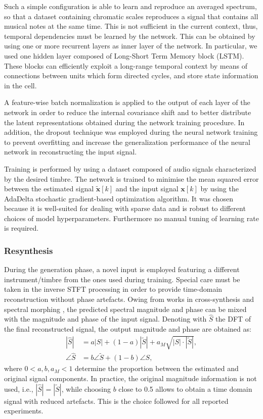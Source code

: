 Such a simple configuration is able to learn and reproduce an averaged spectrum, so that a dataset containing chromatic scales reproduces a signal that contains all musical notes at the same time. This is not sufficient in the current context, thus, temporal dependencies must be learned by the network.
This can be obtained by using one or more recurrent layers as inner layer of the network. In particular, we used one hidden layer composed of Long-Short Term Memory block (LSTM). These blocks can efficiently exploit a long-range temporal context by means of connections between units which form directed cycles, and store state information in the cell.


A feature-wise batch normalization is applied to the output of each layer of the network in order to  reduce the internal covariance shift and to better distribute the latent representations obtained during the network training procedure. In addition, the dropout technique was employed during the neural network training to prevent overfitting and increase the generalization performance of the neural network in reconstructing the input signal. 

Training is performed by using a dataset composed of audio signals characterized by the desired timbre. The network is trained to minimise the mean squared error between the estimated signal $\tilde{\mathbf{x}}[k]$ and the input signal $\mathbf{x}[k]$ by using the AdaDelta stochastic gradient-based optimization algorithm. It was chosen because it is well-suited for dealing with sparse data and is robust to different choices of model hyperparameters. Furthermore no manual tuning of learning rate is required.


\subsubsection{Resynthesis}
During the generation phase, a novel input is employed featuring a different instrument/timbre from the ones used during training. Special care must be taken in the inverse STFT processing in order to provide time-domain reconstruction without phase artefacts. Owing from works in cross-synthesis and spectral morphing \cite{Cella2013advanced}, the predicted spectral magnitude and phase can be mixed with the magnitude and phase of the input signal. Denoting with $\hat{S}$ the DFT of the final reconstructed signal, the output magnitude and phase are obtained as:
\begin{align}
|\hat{S}| &= a |S| + (1-a) |\tilde{S}| + a_M \sqrt{|S|\cdot|\tilde{S}|}, \label{eq:hybridmag}\\
\angle \hat{S} &= b \angle \tilde{S} + (1-b) \angle S,\label{eq:hibrydph}
\end{align}
where $0 < a,b, a_M < 1$ determine the proportion between the estimated and original signal components. In practice, the original magnitude information is not used, i.e., $|\hat{S}| =  |\tilde{S}|$, while choosing $b$ close to 0.5 allows to obtain a time domain signal with reduced artefacts. This is the choice followed for all reported experiments.

